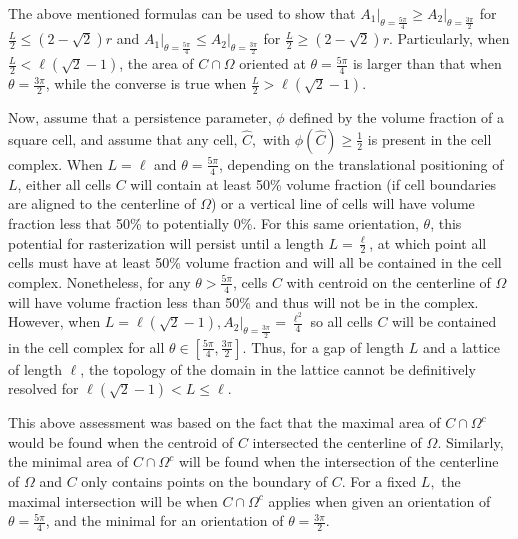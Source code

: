 The above mentioned formulas can be used to show that $A_1\Big|_{\theta = \frac{5\pi}{4}} \geq A_2\Big|_{\theta = \frac{3\pi}{2}}$ for $\frac{L}{2} \leq (2-\sqrt{2})r$ and $A_1\Big|_{\theta = \frac{5\pi}{4}} \leq A_2\Big|_{\theta = \frac{3\pi}{2}}$ for $\frac{L}{2} \geq (2-\sqrt{2})r$.
Particularly, when $\frac{L}{2} < \ell(\sqrt{2}-1)$, the area of $C\cap\Omega$ oriented at $\theta = \frac{5\pi}{4}$ is larger than that when $\theta = \frac{3\pi}{2}$, while the converse is true when $\frac{L}{2} > \ell(\sqrt{2}-1)$.

Now, assume that a persistence parameter, $\phi$ defined by the volume fraction of a square cell, and assume that any cell, $\hat{C},$ with $\phi(\hat{C}) \geq \frac{1}{2}$ is present in the cell complex.
When $L = \ell$ and $\theta = \frac{5\pi}{4}$, depending on the translational positioning of $L$, either all cells $C$ will contain at least 50\% volume fraction (if cell boundaries are aligned to the centerline of $\Omega$) or a vertical line of cells will have volume fraction less that 50\% to potentially 0\%.
For this same orientation, $\theta$, this potential for rasterization will persist until a length $L = \frac{\ell}{2}$, at which point all cells must have at least 50\% volume fraction and will all be contained in the cell complex.
Nonetheless, for any $\theta > \frac{5\pi}{4}$, cells $C$ with centroid on the centerline of $\Omega$  will have volume fraction less than 50\% and thus will not be in the complex.
However, when $L = \ell(\sqrt{2}-1), A_2\Big|_{\theta = \frac{3\pi}{2}} = \frac{\ell^2}{4}$ so all cells $C$ will be contained in the cell complex for all $\theta \in [\frac{5\pi}{4},\frac{3\pi}{2}]$.
Thus, for a gap of length $L$ and a lattice of length $\ell$, the topology of the domain in the lattice cannot be definitively resolved for $\ell(\sqrt{2}-1) < L \leq \ell$.

This above assessment was based on the fact that the maximal area of $C\cap\Omega^c$ would be found when the centroid of $C$ intersected the centerline of $\Omega$.
Similarly, the minimal area of $C\cap\Omega^c$ will be found when the intersection of the centerline of $\Omega$ and $C$ only contains points on the boundary of $C$.
For a fixed $L,$ the maximal intersection will be when $C\cap\Omega^c$ applies when given an orientation of $\theta = \frac{5\pi}{4}$, and the minimal for an orientation of $\theta = \frac{3\pi}{2}$.

